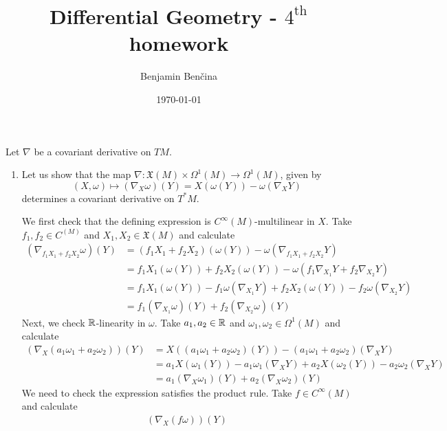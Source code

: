 \documentclass[a4paper, 12pt]{article}
\title{Differential Geometry - $4^{\text{th}}$ homework}
\author{Benjamin Benčina}
\date{\today}
\begin{document}
\maketitle

\begin{Exercise}
    Let $\nabla$ be a covariant derivative on $TM$.
    \begin{enumerate}[label=(\roman*)]
        \item Let us show that the map $\nabla \colon \mathfrak{X}(M)\times\Omega^1(M) \to \Omega^1(M)$,
            given by
            \[
                (X, \omega) \mapsto (\nabla_X\omega)(Y) = X(\omega(Y)) - \omega(\nabla_XY)
            \]
            determines a covariant derivative on $T^*M$.

            We first check that the defining expression is $C^\infty(M)$-multilinear in $X$.
            Take $f_1, f_2 \in C^(M)$ and $X_1, X_2 \in \mathfrak{X}(M)$ and calculate
            \begin{align*}
                (\nabla_{f_1X_1 + f_2X_2}\omega)(Y)
                &= (f_1X_1 + f_2X_2)(\omega(Y)) - \omega(\nabla_{f_1X_1 + f_2X_2}Y) \\
                &= f_1X_1(\omega(Y)) + f_2X_2(\omega(Y)) - \omega(f_1\nabla_{X_1}Y + f_2\nabla_{X_2}Y) \\
                &= f_1X_1(\omega(Y)) - f_1\omega(\nabla_{X_1}Y) + f_2X_2(\omega(Y)) - f_2\omega(\nabla_{X_2}Y) \\
                &= f_1(\nabla_{X_1}\omega)(Y) + f_2(\nabla_{X_2}\omega)(Y)
            \end{align*}
            Next, we check $\mathbb{R}$-linearity in $\omega$.
            Take $a_1, a_2 \in \mathbb{R}$ and $\omega_1, \omega_2 \in \Omega^1(M)$ and calculate
            \begin{align*}
                (\nabla_X(a_1\omega_1 + a_2\omega_2))(Y)
                &= X((a_1\omega_1 + a_2\omega_2)(Y)) - (a_1\omega_1 + a_2\omega_2)(\nabla_XY) \\
                &= a_1X(\omega_1(Y)) - a_1\omega_1(\nabla_XY) + a_2X(\omega_2(Y)) - a_2\omega_2(\nabla_XY) \\
                &= a_1(\nabla_X\omega_1)(Y) + a_2(\nabla_X\omega_2)(Y)
            \end{align*}
            We need to check the expression satisfies the product rule.
            Take $f \in C^\infty(M)$ and calculate
            \begin{align*}
                (\nabla_X(f\omega))(Y)

\end{align*}
\end{enumerate}
\end{Exercise}
\end{document}
